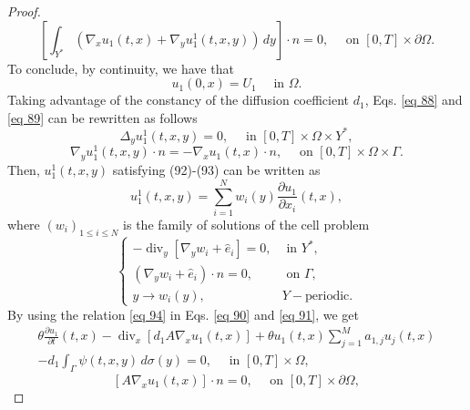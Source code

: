 \begin{proof}
\begin{equation}
 {\left[\int_{Y^{*}}\left(\nabla_{x} u_{1}(t, x)+\nabla_{y} u_{1}^{1}(t, x, y)\right) \, d  y\right] \cdot n=0, \quad \text { on }[0, T] \times \partial \Omega}.
\label{eq 91}\end{equation}
To conclude, by continuity, we have that
$$
u_{1}(0, x)=U_{1} \quad \text { in } \Omega .
$$
Taking advantage of the constancy of the diffusion coefficient $d_{1}$, Eqs. \eqref{eq 88} and \eqref{eq 89} can be rewritten as follows
\begin{equation}
\Delta_{y} u_{1}^{1}(t, x, y)=0, \quad \text { in }[0, T] \times \Omega \times Y^{*},
\label{eq 92}\end{equation}
\begin{equation}
 \nabla_{y} u_{1}^{1}(t, x, y) \cdot n=-\nabla_{x} u_{1}(t, x) \cdot n, \quad \text { on }[0, T] \times \Omega \times \Gamma.
\label{eq 93}\end{equation}
Then, $u_{1}^{1}(t, x, y)$ satisfying (92)-(93) can be written as
\begin{equation}
 u_{1}^{1}(t, x, y)=\sum_{i=1}^{N} w_{i}(y) \frac{\partial u_{1}}{\partial x_{i}}(t, x),
\label{eq 94}\end{equation}
where $\left(w_{i}\right)_{1 \leq i \leq N}$ is the family of solutions of the cell problem
\begin{equation}
 \begin{cases}-\operatorname{div}_{y}\left[\nabla_{y} w_{i}+\hat{e}_{i}\right]=0, & \text { in } Y^{*}, \\ \left(\nabla_{y} w_{i}+\hat{e}_{i}\right) \cdot n=0, & \text { on } \Gamma, \\ y \rightarrow w_{i}(y), & Y-\text {periodic}. \end{cases}
\label{eq 95}\end{equation}
By using the relation \eqref{eq 94} in Eqs. \eqref{eq 90} and \eqref{eq 91}, we get
\begin{equation}
 \begin{split}
    \theta \frac{\partial u_{1}}{\partial t}(t, x)-\operatorname{div}_{x}\left[d_{1} A \nabla_{x} u_{1}(t, x)\right]+\theta u_{1}(t, x) \sum_{j=1}^{M} a_{1, j} u_{j}(t, x) \\
   -d_{1} \int_{\Gamma} \psi(t, x, y) \, d  \sigma(y)=0, \quad \text { in }[0, T] \times \Omega,
 \end{split}
\label{eq 96}\end{equation}
\begin{equation}
 \left[A \nabla_{x} u_{1}(t, x)\right] \cdot n=0, \quad \text { on }[0, T] \times \partial \Omega,

\end{equation}
\end{proof}
